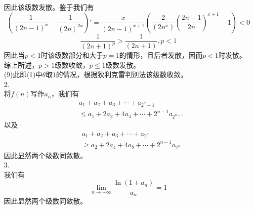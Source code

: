 \documentclass[utf8]{ctexart}
\begin{document}
因此该级数发散。鉴于我们有
\[(\frac{1}{(2n-1)^x}-\frac{1}{(2n)^{2x}})'=\frac{x}{(2n-1)^{x+1}}(\frac{2}{(2n^x)}(\frac{2n-1}{2n})^{x+1}-1)<0\]
\[\frac{1}{(2n+1)^p}>\frac{1}{(2n+1)},p<1\]
因此当$p<1$时该级数部分和大于$p=1$的情形，且后者发散，因而$p<1$时发散。\\
综上所述，$p>1$级数收敛，$p\le1$级数发散。\\
(9)此即(1)中$\theta$取$1$的情况，根据狄利克雷判别法该级数收敛。\\
2.\\
将$f(n)$写作$a_n$，我们有
\begin{align*}
	&a_1+a_2+a_3+\cdots+a_{2^n-1}\\
	&\le a_1+2a_2+4a_4+\cdots+2^{n-1}a_{2^{n-1}}	
\end{align*}
以及
\begin{align*}
	&a_1+a_2+a_3+\cdots+a_{2^n}\\
	&\ge a_2+2a_4+4a_8+\cdots+2^{n-1}a_{2^n}
\end{align*}
因此显然两个级数同敛散。\\
3.\\
我们有
\[\lim_{n\rightarrow+\infty}\frac{\ln(1+a_n)}{a_n}=1\]
因此显然两个级数同敛散。
\end{document}

